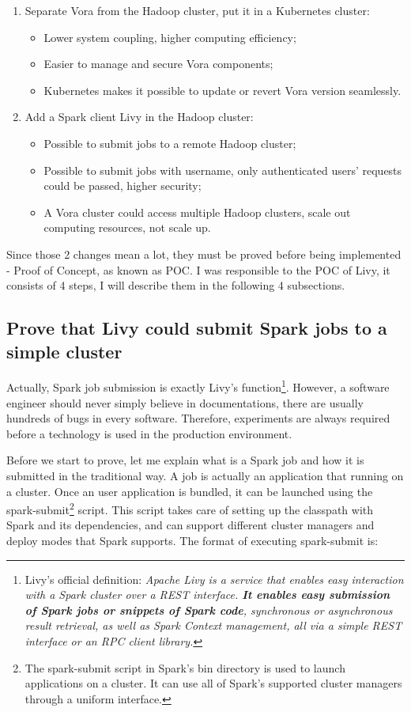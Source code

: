 \documentclass[article,colorback,accentcolor=tud4c]{tudreport}
\begin{document}
\begin{enumerate}
	\item Separate Vora from the Hadoop cluster, put it in a Kubernetes cluster:
	\begin{itemize}
		\item Lower system coupling, higher computing efficiency;
		\item Easier to manage and secure Vora components;
		\item Kubernetes makes it possible to update or revert Vora version seamlessly.
	\end{itemize}
	\item Add a Spark client Livy in the Hadoop cluster:
	\begin{itemize}
		\item Possible to submit jobs to a remote Hadoop cluster;
		\item Possible to submit jobs with username, only authenticated users' requests could be passed, higher security;
		\item A Vora cluster could access multiple Hadoop clusters, scale out computing resources, not scale up.
	\end{itemize}
\end{enumerate}

Since those 2 changes mean a lot, they must be proved before being implemented - Proof of Concept, as known as POC. I was responsible to  the POC of Livy, it consists of 4 steps, I will describe them in the following 4 subsections.

	\subsection{Prove that Livy could submit Spark jobs to a simple cluster}
	Actually, Spark job submission is exactly Livy's function\footnote{Livy's official definition: \textit{Apache Livy is a service that enables easy interaction with a Spark cluster over a REST interface. \textbf{It enables easy submission of Spark jobs or snippets of Spark code}, synchronous or asynchronous result retrieval, as well as Spark Context management, all via a simple REST interface or an RPC client library.\cite{what is livy}}}. However, a software engineer should never simply believe in documentations, there are usually hundreds of bugs in every software. Therefore, experiments are always required before a technology is used in the production environment.
	
	Before we start to prove, let me explain what is a Spark job and how it is submitted in the traditional way. A job is actually an application that running on a cluster. Once an user application is bundled, it can be launched using the spark-submit\footnote{The spark-submit script in Spark's bin directory is used to launch applications on a cluster. It can use all of Spark’s supported cluster managers through a uniform interface.\cite{spark submit}} script. This script takes care of setting up the classpath with Spark and its dependencies, and can support different cluster managers and deploy modes that Spark supports. The format of executing spark-submit is:
	
\end{document}
